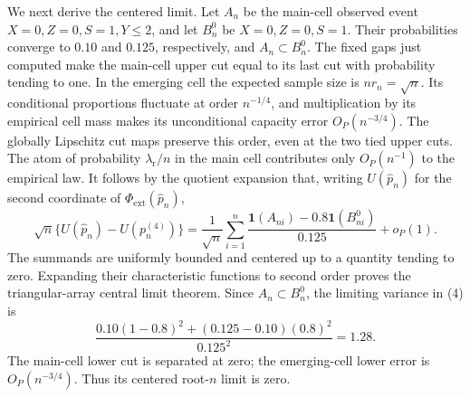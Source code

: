 We next derive the centered limit.  Let \(A_n\) be the main-cell observed event \(X=0,Z=0,S=1,Y\le2\), and let \(B_n^0\) be \(X=0,Z=0,S=1\).  Their probabilities converge to \(0.10\) and \(0.125\), respectively, and \(A_n\subset B_n^0\).  The fixed gaps just computed make the main-cell upper cut equal to its last cut with probability tending to one.  In the emerging cell the expected sample size is \(nr_n=\sqrt n\).  Its conditional proportions fluctuate at order \(n^{-1/4}\), and multiplication by its empirical cell mass makes its unconditional capacity error \(O_P(n^{-3/4})\).  The globally Lipschitz cut maps preserve this order, even at the two tied upper cuts.  The atom of probability \(\lambda_{\mathrm r}/n\) in the main cell contributes only \(O_P(n^{-1})\) to the empirical law.  It follows by the quotient expansion that, writing \(U(\widehat p_n)\) for the second coordinate of \(\Phi_{\mathrm{ext}}(\widehat p_n)\),
\[
\sqrt n\{U(\widehat p_n)-U(p_n^{(4)})\}
=\frac1{\sqrt n}\sum_{i=1}^n
\frac{\mathbf 1(A_{ni})-0.8\mathbf 1(B_{ni}^0)}{0.125}+o_P(1).
\tag{4}
\]
The summands are uniformly bounded and centered up to a quantity tending to zero.  Expanding their characteristic functions to second order proves the triangular-array central limit theorem.  Since \(A_n\subset B_n^0\), the limiting variance in (4) is
\[
\frac{0.10(1-0.8)^2+(0.125-0.10)(0.8)^2}{0.125^2}=1.28.
\]
The main-cell lower cut is separated at zero; the emerging-cell lower error is \(O_P(n^{-3/4})\).  Thus its centered root-\(n\) limit is zero.

